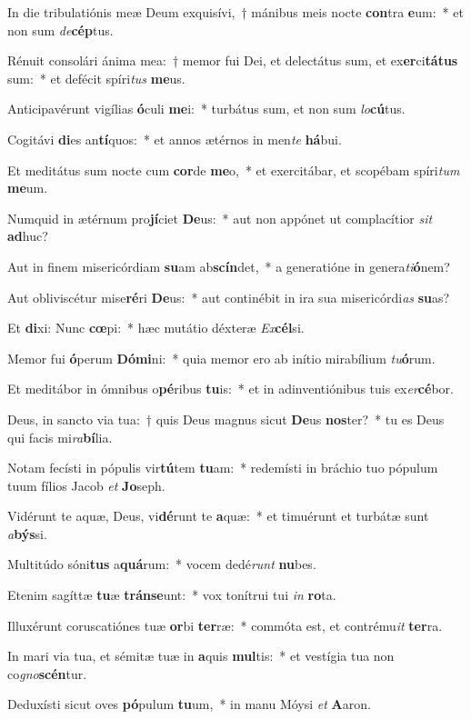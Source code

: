 \item In die tribulatiónis meæ Deum exquisívi,~† mánibus meis nocte \textbf{con}tra \textbf{e}um:~* et non sum \textit{de}\textbf{cép}tus.
\item Rénuit consolári ánima mea:~† memor fui Dei, et delectátus sum, et ex\textbf{er}ci\textbf{tá}\textbf{tus} sum:~* et defécit spíri\textit{tus} \textbf{me}us.
\item Anticipavérunt vigílias \textbf{ó}culi \textbf{me}i:~* turbátus sum, et non sum \textit{lo}\textbf{cú}tus.
\item Cogitávi \textbf{di}es an\textbf{tí}quos:~* et annos ætérnos in men\textit{te} \textbf{há}bui.
\item Et meditátus sum nocte cum \textbf{cor}de \textbf{me}o,~* et exercitábar, et scopébam spíri\textit{tum} \textbf{me}um.
\item Numquid in ætérnum pro\textbf{jí}ciet \textbf{De}us:~* aut non appónet ut complacítior \textit{sit} \textbf{ad}huc?
\item Aut in finem misericórdiam \textbf{su}am ab\textbf{scín}det,~* a generatióne in genera\textit{ti}\textbf{ó}nem?
\item Aut obliviscétur mise\textbf{ré}ri \textbf{De}us:~* aut continébit in ira sua misericórdi\textit{as} \textbf{su}as?
\item Et \textbf{di}xi: Nunc \textbf{cœ}pi:~* hæc mutátio déxteræ \textit{Ex}\textbf{cél}si.
\item Memor fui \textbf{ó}perum \textbf{Dó}\textbf{mi}ni:~* quia memor ero ab inítio mirabílium \textit{tu}\textbf{ó}rum.
\item Et meditábor in ómnibus o\textbf{pé}ribus \textbf{tu}is:~* et in adinventiónibus tuis ex\textit{er}\textbf{cé}bor.
\item Deus, in sancto via tua:~† quis Deus magnus sicut \textbf{De}us \textbf{nos}ter?~* tu es Deus qui facis mi\textit{ra}\textbf{bí}lia.
\item Notam fecísti in pópulis vir\textbf{tú}tem \textbf{tu}am:~* redemísti in bráchio tuo pópulum tuum fílios Jacob \textit{et} \textbf{Jo}seph.
\item Vidérunt te aquæ, Deus, vi\textbf{dé}runt te \textbf{a}quæ:~* et timuérunt et turbátæ sunt \textit{a}\textbf{býs}si.
\item Multitúdo sóni\textbf{tus} a\textbf{quá}rum:~* vocem dedé\textit{runt} \textbf{nu}bes.
\item Etenim sagíttæ \textbf{tu}æ \textbf{tráns}\textbf{e}unt:~* vox tonítrui tui \textit{in} \textbf{ro}ta.
\item Illuxérunt coruscatiónes tuæ \textbf{or}bi \textbf{ter}ræ:~* commóta est, et contrému\textit{it} \textbf{ter}ra.
\item In mari via tua, et sémitæ tuæ in \textbf{a}quis \textbf{mul}tis:~* et vestígia tua non co\textit{gno}\textbf{scén}tur.
\item Deduxísti sicut oves \textbf{pó}pulum \textbf{tu}um,~* in manu Móysi \textit{et} \textbf{A}aron.

